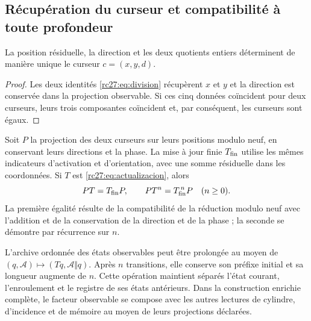 \subsection{Récupération du curseur et compatibilité à toute profondeur}

\begin{proposition}
La position résiduelle, la direction et les deux quotients entiers
déterminent de manière unique le curseur $c=(x,y,d)$.
\end{proposition}
\begin{proof}
Les deux identités \eqref{rc27:eq:division} récupèrent $x$ et $y$
et la direction est conservée dans la projection observable. Si ces
cinq données coïncident pour deux curseurs, leurs trois
composantes coïncident et, par conséquent, les curseurs sont égaux.
\end{proof}

Soit $P$ la projection des deux curseurs sur leurs positions modulo
neuf, en conservant leurs directions et la phase. La mise à jour
finie $T_{\rm fin}$ utilise les mêmes indicateurs d'activation et
d'orientation, avec une somme résiduelle dans les coordonnées. Si $T$ est
\eqref{rc27:eq:actualizacion}, alors
\[
PT=T_{\rm fin}P,\qquad PT^n=T_{\rm fin}^{\,n}P
\quad(n\ge0).
\]
La première égalité résulte de la compatibilité de la réduction
modulo neuf avec l'addition et de la conservation de la direction et de la phase ;
la seconde se démontre par récurrence sur $n$.

L'archive ordonnée des états observables peut être prolongée au moyen de
$(q,\mathcal A)\mapsto(Tq,\mathcal A\Vert q)$.
Après $n$ transitions, elle conserve son préfixe initial et sa longueur
augmente de $n$. Cette opération maintient séparés l'état courant,
l'enroulement et le registre de ses états antérieurs. Dans la
construction enrichie complète, le facteur observable se compose
avec les autres lectures de cylindre, d'incidence et de mémoire au moyen de leurs
projections déclarées.

